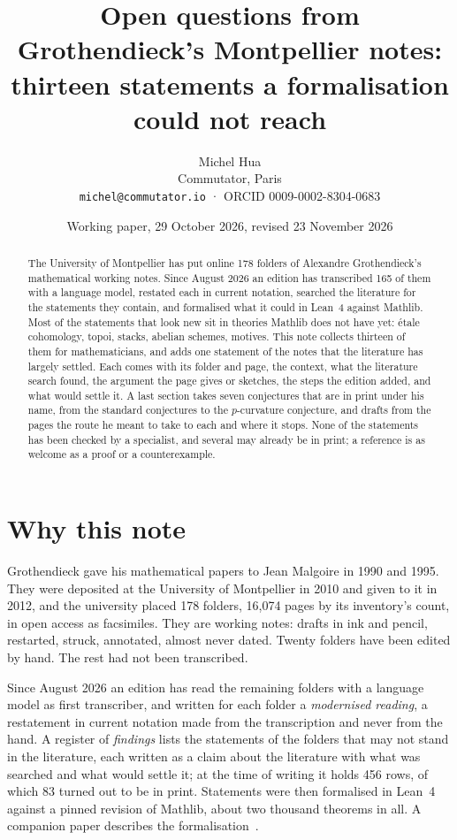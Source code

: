\documentclass[11pt]{article}
\title{Open questions from Grothendieck's Montpellier notes:\\ thirteen statements a formalisation could not reach}
\author{Michel Hua\\ \small Commutator, Paris\\ \small\texttt{michel@commutator.io} · ORCID 0009-0002-8304-0683}
\date{Working paper, 29 October 2026, revised 23 November 2026}
\theoremstyle{definition}
\theoremstyle{plain}\newtheorem*{proposition}{Proposition}\theoremstyle{definition}
\begin{document}
\maketitle

\begin{abstract}
The University of Montpellier has put online 178 folders of Alexandre Grothendieck's mathematical working notes. Since August 2026 an edition has transcribed 165 of them with a language model, restated each in current notation, searched the literature for the statements they contain, and formalised what it could in Lean~4 against Mathlib. Most of the statements that look new sit in theories Mathlib does not have yet: étale cohomology, topoi, stacks, abelian schemes, motives. This note collects thirteen of them for mathematicians, and adds one statement of the notes that the literature has largely settled. Each comes with its folder and page, the context, what the literature search found, the argument the page gives or sketches, the steps the edition added, and what would settle it. A last section takes seven conjectures that are in print under his name, from the standard conjectures to the $p$-curvature conjecture, and drafts from the pages the route he meant to take to each and where it stops. None of the statements has been checked by a specialist, and several may already be in print; a reference is as welcome as a proof or a counterexample.
\end{abstract}


\section{Why this note}

Grothendieck gave his mathematical papers to Jean Malgoire in 1990 and 1995. They were deposited at the University of Montpellier in 2010 and given to it in 2012, and the university placed 178 folders, 16,074 pages by its inventory's count, in open access as facsimiles. They are working notes: drafts in ink and pencil, restarted, struck, annotated, almost never dated. Twenty folders have been edited by hand. The rest had not been transcribed.

Since August 2026 an edition has read the remaining folders with a language model as first transcriber, and written for each folder a \emph{modernised reading}, a restatement in current notation made from the transcription and never from the hand. A register of \emph{findings} lists the statements of the folders that may not stand in the literature, each written as a claim about the literature with what was searched and what would settle it; at the time of writing it holds 456 rows, of which 83 turned out to be in print. Statements were then formalised in Lean~4 against a pinned revision of Mathlib, about two thousand theorems in all. A companion paper describes the formalisation~\cite{huacicm}.
\end{document}
